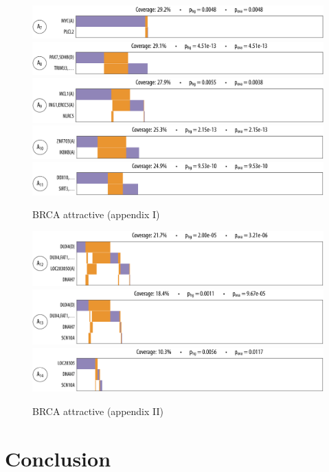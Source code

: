 \begin{figure}[htb]
\centering
\includegraphics[width=\textwidth]{figures/genes/brca_9_a.pdf}\\[2em]
\includegraphics[width=\textwidth]{figures/genes/brca_13_a.pdf}\\[2em]
\includegraphics[width=\textwidth]{figures/genes/brca_5_a.pdf}\\[2em]
\includegraphics[width=\textwidth]{figures/genes/brca_10_a.pdf}\\[2em]
\includegraphics[width=\textwidth]{figures/genes/brca_12_a.pdf}\\[2em]
\caption{BRCA attractive (appendix I)}
\end{figure}

\begin{figure}[htb]
\centering
\includegraphics[width=\textwidth]{figures/genes/brca_3_a.pdf}\\[2em]
\includegraphics[width=\textwidth]{figures/genes/brca_2_a.pdf}\\[2em]
\includegraphics[width=\textwidth]{figures/genes/brca_6_a.pdf}\\[2em]
\caption{BRCA attractive (appendix II)}
\end{figure}

\section{Conclusion}